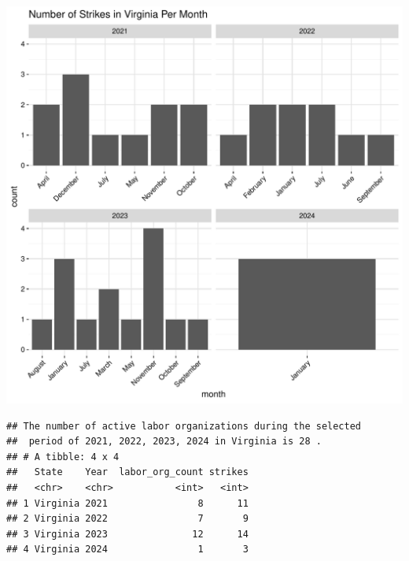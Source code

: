 \documentclass[11pt]{article}\usepackage[]{graphicx}\usepackage[]{xcolor}
\makeatletter
\newenvironment{kframe}{%
 \def\at@end@of@kframe{}%
 \ifinner\ifhmode%
  \def\at@end@of@kframe{\end{minipage}}%
  \begin{minipage}{\columnwidth}%
 \fi\fi%
 \def\FrameCommand##1{\hskip\@totalleftmargin \hskip-\fboxsep
 \colorbox{shadecolor}{##1}\hskip-\fboxsep
     \hskip-\linewidth \hskip-\@totalleftmargin \hskip\columnwidth}%
 \MakeFramed {\advance\hsize-\width
   \@totalleftmargin\z@ \linewidth\hsize
   \@setminipage}}%
 {\par\unskip\endMakeFramed%
 \at@end@of@kframe}
\newenvironment{knitrout}{}{} %
\makeatother
\begin{document}
\begin{knitrout}
\color{fgcolor}

{\centering \includegraphics[width=0.7\linewidth]{figure/calling_the_ggplots_Virginia-1} 

}


\begin{kframe}\begin{verbatim}
## The number of active labor organizations during the selected 
##  period of 2021, 2022, 2023, 2024 in Virginia is 28 .
## # A tibble: 4 x 4
##   State    Year  labor_org_count strikes
##   <chr>    <chr>           <int>   <int>
## 1 Virginia 2021                8      11
## 2 Virginia 2022                7       9
## 3 Virginia 2023               12      14
## 4 Virginia 2024                1       3
\end{verbatim}
\end{kframe}
\end{knitrout}
\end{document}
